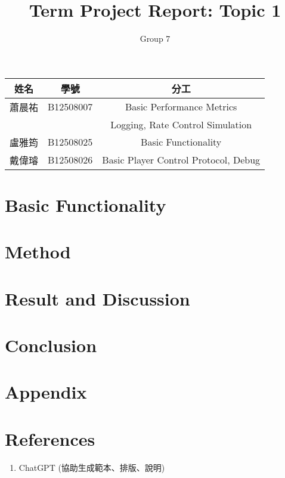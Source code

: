 \documentclass[12pt,a4paper]{article}
\title{Term Project Report: Topic 1}
\author{Group 7}
\begin{document}
\maketitle

    \begin{table}[htbp]
    \centering
    \begin{tabular}{ccc}
        \toprule
            姓名 & 學號 & 分工 \\
        \midrule
        \hline
            蕭晨祐 & B12508007 & Basic Performance Metrics \\
            & & Logging, Rate Control Simulation \\
            盧雅筠 & B12508025 & Basic Functionality \\
            戴偉璿 & B12508026 & Basic Player Control Protocol, Debug \\
        \bottomrule
        \end{tabular}
    \end{table}

\newpage
\section{Basic Functionality}



\section{Method}

\section{Result and Discussion}

\section{Conclusion}

\newpage
\appendix
\section*{Appendix}


\newpage
\section*{References}
\begin{enumerate}[label={\arabic*.}]
  \item ChatGPT (協助生成範本、排版、說明)
\end{enumerate}
\end{document}
